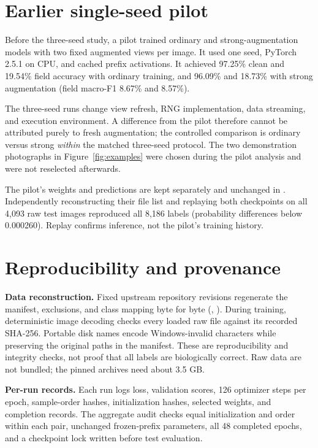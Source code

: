 \documentclass[11pt,letterpaper]{article}
\newcommand{\code}[1]{\texttt{\detokenize{#1}}}
\begin{document}
\appendix
\section{Earlier single-seed pilot}\label{app:pilot}
Before the three-seed study, a pilot trained ordinary and strong-augmentation models with two fixed augmented views per image. It used one seed, PyTorch 2.5.1 on CPU, and cached prefix activations. It achieved 97.25\% clean and 19.54\% field accuracy with ordinary training, and 96.09\% and 18.73\% with strong augmentation (field macro-F1 8.67\% and 8.57\%).

The three-seed runs change view refresh, RNG implementation, data streaming, and execution environment. A difference from the pilot therefore cannot be attributed purely to fresh augmentation; the controlled comparison is ordinary versus strong \emph{within} the matched three-seed protocol. The two demonstration photographs in Figure~\ref{fig:examples} were chosen during the pilot analysis and were not reselected afterwards.

The pilot's weights and predictions are kept separately and unchanged in \code{results/}. Independently reconstructing their file list and replaying both checkpoints on all 4,093 raw test images reproduced all 8,186 labels (probability differences below 0.000260). Replay confirms inference, not the pilot's training history.

\section{Reproducibility and provenance}\label{app:repro}
\textbf{Data reconstruction.} Fixed upstream repository revisions regenerate the manifest, exclusions, and class mapping byte for byte (\code{download.py}, \code{prepare.py}). During training, deterministic image decoding checks every loaded raw file against its recorded SHA-256. Portable disk names encode Windows-invalid characters while preserving the original paths in the manifest. These are reproducibility and integrity checks, not proof that all labels are biologically correct. Raw data are not bundled; the pinned archives need about 3.5 GB.

\textbf{Per-run records.} Each run logs loss, validation scores, 126 optimizer steps per epoch, sample-order hashes, initialization hashes, selected weights, and completion records. The aggregate audit checks equal initialization and order within each pair, unchanged frozen-prefix parameters, all 48 completed epochs, and a checkpoint lock written before test evaluation.
\end{document}
